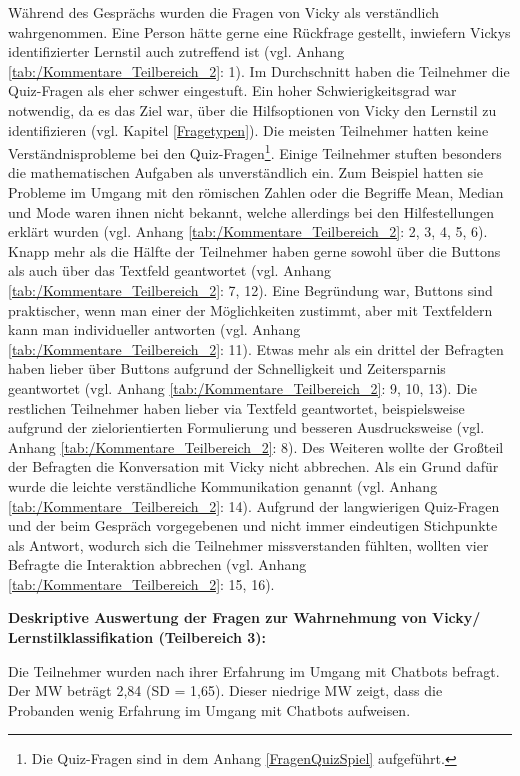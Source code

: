 Während des Gesprächs wurden die Fragen von Vicky als verständlich wahrgenommen. Eine Person hätte gerne eine 
Rückfrage gestellt, inwiefern Vickys identifizierter Lernstil auch zutreffend ist (vgl. Anhang \ref{tab:/Kommentare_Teilbereich_2}: 1). 
Im Durchschnitt haben die Teilnehmer die 
Quiz-Fragen als eher schwer eingestuft. Ein hoher Schwierigkeitsgrad war notwendig, da es das Ziel war, über die Hilfsoptionen von
Vicky den Lernstil zu identifizieren (vgl. Kapitel \ref{Fragetypen}).
Die meisten Teilnehmer hatten keine Verständnisprobleme bei den Quiz-Fragen\footnote{Die Quiz-Fragen sind in dem Anhang \ref{FragenQuizSpiel} aufgeführt.}.
Einige Teilnehmer stuften besonders die mathematischen Aufgaben als unverständlich ein. Zum Beispiel 
hatten sie Probleme im Umgang mit den römischen Zahlen oder die Begriffe \glqq Mean\grqq{}, \glqq Median\grqq{} und \glqq Mode\grqq{} waren ihnen nicht bekannt,
welche allerdings bei den Hilfestellungen erklärt wurden (vgl. Anhang  \ref{tab:/Kommentare_Teilbereich_2}: 2, 3, 4, 5, 6).
Knapp mehr als die Hälfte der Teilnehmer haben gerne sowohl über die Buttons als auch über das Textfeld geantwortet (vgl. Anhang  \ref{tab:/Kommentare_Teilbereich_2}: 7, 12).
Eine Begründung war, \glqq Buttons sind praktischer, wenn man einer der Möglichkeiten zustimmt, aber mit Textfeldern kann man individueller antworten\grqq{} (vgl. Anhang  \ref{tab:/Kommentare_Teilbereich_2}: 11).
Etwas mehr als ein drittel der Befragten haben lieber über Buttons aufgrund der Schnelligkeit und Zeitersparnis geantwortet (vgl. Anhang \ref{tab:/Kommentare_Teilbereich_2}: 9, 10, 13).
Die restlichen Teilnehmer haben lieber via Textfeld geantwortet, beispielsweise aufgrund der zielorientierten Formulierung und besseren Ausdrucksweise (vgl. Anhang  \ref{tab:/Kommentare_Teilbereich_2}: 8).
Des Weiteren wollte der Großteil der Befragten die Konversation mit Vicky nicht abbrechen. Als ein Grund dafür wurde die leichte verständliche 
Kommunikation genannt (vgl. Anhang \ref{tab:/Kommentare_Teilbereich_2}: 14).
Aufgrund der langwierigen Quiz-Fragen und der beim Gespräch vorgegebenen und nicht immer eindeutigen Stichpunkte als Antwort, wodurch sich die Teilnehmer 
missverstanden fühlten, wollten vier Befragte die Interaktion abbrechen (vgl. Anhang \ref{tab:/Kommentare_Teilbereich_2}: 15, 16).

\textbf{Deskriptive Auswertung der Fragen zur Wahrnehmung von Vicky/ Lernstilklassifikation (Teilbereich 3): }


Die Teilnehmer wurden nach ihrer Erfahrung im Umgang mit Chatbots befragt. 
Der MW beträgt 2,84 (SD = 1,65). Dieser niedrige MW zeigt, dass 
die Probanden wenig Erfahrung im Umgang mit Chatbots aufweisen.

